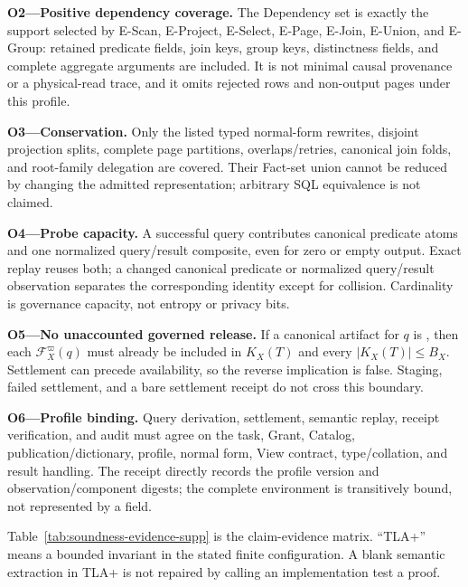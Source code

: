 \documentclass[journal,onecolumn]{IEEEtran}
\newcommand{\code}[1]{\texttt{\detokenize{#1}}}
\newcommand{\facts}{\mathcal F}
\begin{document}
\textbf{O2---Positive dependency coverage.} The Dependency set is exactly the
support selected by E-Scan, E-Project, E-Select, E-Page, E-Join, E-Union, and
E-Group: retained predicate fields, join keys, group keys, distinctness fields,
and complete aggregate arguments are included. It is not minimal causal
provenance or a physical-read trace, and it omits rejected rows and non-output
pages under this profile.

\textbf{O3---Conservation.} Only the listed typed normal-form rewrites,
disjoint projection splits, complete page partitions, overlaps/retries,
canonical join folds, and root-family delegation are covered. Their Fact-set
union cannot be reduced by changing the admitted representation; arbitrary SQL
equivalence is not claimed.

\textbf{O4---Probe capacity.} A successful query contributes canonical
predicate atoms and one normalized query/result composite, even for zero or
empty output. Exact replay reuses both; a changed canonical predicate or
normalized query/result observation separates the corresponding identity
except for collision. Cardinality is governance capacity, not entropy or
privacy bits.

\textbf{O5---No unaccounted governed release.} If a canonical artifact for $q$
is \code{AVAILABLE}, then each $\facts_X^\varpi(q)$ must already be included in
$K_X(T)$ and every $|K_X(T)|\leq B_X$. Settlement can precede availability, so
the reverse implication is false. Staging, failed settlement, and a bare
settlement receipt do not cross this boundary.

\textbf{O6---Profile binding.} Query derivation, settlement, semantic replay,
receipt verification, and audit must agree on the task, Grant, Catalog,
publication/dictionary, profile, normal form, View contract, type/collation,
and result handling. The receipt directly records the profile version and
observation/component digests; the complete environment is transitively bound,
not represented by a \code{profile_digest} field.

Table~\ref{tab:soundness-evidence-supp} is the claim-evidence matrix. ``TLA+''
means a bounded invariant in the stated finite configuration. A blank semantic
extraction in TLA+ is not repaired by calling an implementation test a proof.
\end{document}
